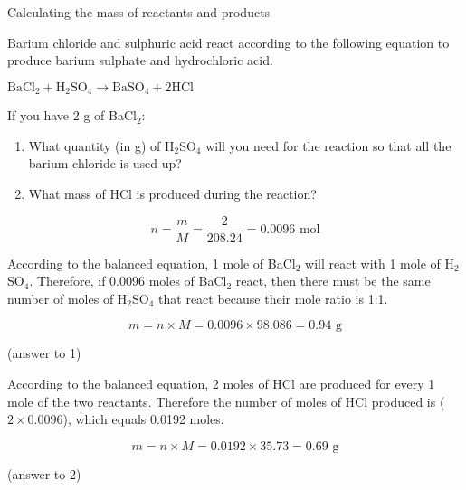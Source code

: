 \begin{wex}{Calculating the mass of reactants and products}{Barium chloride and sulphuric acid react according to the following equation to produce barium sulphate and hydrochloric acid.
\begin{center}
$\text{BaCl}_{2} + \text{H}_{2}\text{SO}_{4} \rightarrow \text{BaSO}_{4} + 2\text{HCl}$
\end{center}

If you have 2 g of BaCl$_{2}$:

\begin{enumerate}
\item{What quantity (in g) of H$_{2}$SO$_{4}$ will you need for the reaction so that all the barium chloride is used up?}
\item{What mass of HCl is produced during the reaction?}
\end{enumerate}
}

{
\begin{equation*}
n = \frac{m}{M} = \frac{2}{208.24} = 0.0096 \text{ mol}
\end{equation*}
}

{
According to the balanced equation, 1 mole of BaCl$_{2}$ will react with 1 mole of H$_{2}$SO$_{4}$. Therefore, if 0.0096 moles of BaCl$_{2}$ react, then there must be the same number of moles of H$_{2}$SO$_{4}$ that react because their mole ratio is 1:1.\\
}

{

\begin{equation*}
m = n \times M = 0.0096 \times 98.086 = 0.94 \text{ g}
\end{equation*}

(answer to 1)\\
}

{
According to the balanced equation, 2 moles of HCl are produced for every 1 mole of the two reactants. Therefore the number of moles of HCl produced is ($2 \times 0.0096$), which equals 0.0192 moles. \\
}

{

\begin{equation*}
m = n \times M = 0.0192 \times 35.73 = 0.69 \text{ g}
\end{equation*}

(answer to 2)
}
\end{wex}

